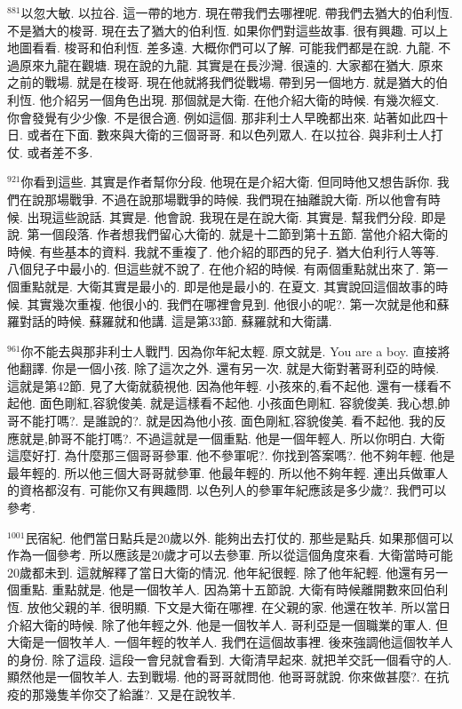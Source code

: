 \documentclass{book}
\begin{document}
$^{881}$以忽大敏.
以拉谷.
這一帶的地方.
現在帶我們去哪裡呢.
帶我們去猶大的伯利恆.
不是猶大的梭哥.
現在去了猶大的伯利恆.
如果你們對這些故事.
很有興趣.
可以上地圖看看.
梭哥和伯利恆.
差多遠.
大概你們可以了解.
可能我們都是在說.
九龍.
不過原來九龍在觀塘.
現在說的九龍.
其實是在長沙灣.
很遠的.
大家都在猶大.
原來之前的戰場.
就是在梭哥.
現在他就將我們從戰場.
帶到另一個地方.
就是猶大的伯利恆.
他介紹另一個角色出現.
那個就是大衛.
在他介紹大衛的時候.
有幾次經文.
你會發覺有少少像.
不是很合適.
例如這個.
那非利士人早晚都出來.
站著如此四十日.
或者在下面.
數來與大衛的三個哥哥.
和以色列眾人.
在以拉谷.
與非利士人打仗.
或者差不多.

$^{921}$你看到這些.
其實是作者幫你分段.
他現在是介紹大衛.
但同時他又想告訴你.
我們在說那場戰爭.
不過在說那場戰爭的時候.
我們現在抽離說大衛.
所以他會有時候.
出現這些說話.
其實是.
他會說.
我現在是在說大衛.
其實是.
幫我們分段.
即是說.
第一個段落.
作者想我們留心大衛的.
就是十二節到第十五節.
當他介紹大衛的時候.
有些基本的資料.
我就不重複了.
他介紹的耶西的兒子.
猶大伯利行人等等.
八個兒子中最小的.
但這些就不說了.
在他介紹的時候.
有兩個重點就出來了.
第一個重點就是.
大衛其實是最小的.
即是他是最小的.
在夏文.
其實說回這個故事的時候.
其實幾次重複.
他很小的.
我們在哪裡會見到.
他很小的呢?.
第一次就是他和蘇羅對話的時候.
蘇羅就和他講.
這是第33節.
蘇羅就和大衛講.

$^{961}$你不能去與那非利士人戰鬥.
因為你年紀太輕.
原文就是.
You are a boy.
直接將他翻譯.
你是一個小孩.
除了這次之外.
還有另一次.
就是大衛對著哥利亞的時候.
這就是第42節.
見了大衛就藐視他.
因為他年輕.
小孩來的,看不起他.
還有一樣看不起他.
面色剛紅,容貌俊美.
就是這樣看不起他.
小孩面色剛紅.
容貌俊美.
我心想,帥哥不能打嗎?.
是誰說的?.
就是因為他小孩.
面色剛紅,容貌俊美.
看不起他.
我的反應就是,帥哥不能打嗎?.
不過這就是一個重點.
他是一個年輕人.
所以你明白.
大衛這麼好打.
為什麼那三個哥哥參軍.
他不參軍呢?.
你找到答案嗎?.
他不夠年輕.
他是最年輕的.
所以他三個大哥哥就參軍.
他最年輕的.
所以他不夠年輕.
連出兵做軍人的資格都沒有.
可能你又有興趣問.
以色列人的參軍年紀應該是多少歲?.
我們可以參考.

$^{1001}$民宿紀.
他們當日點兵是20歲以外.
能夠出去打仗的.
那些是點兵.
如果那個可以作為一個參考.
所以應該是20歲才可以去參軍.
所以從這個角度來看.
大衛當時可能20歲都未到.
這就解釋了當日大衛的情況.
他年紀很輕.
除了他年紀輕.
他還有另一個重點.
重點就是.
他是一個牧羊人.
因為第十五節說.
大衛有時候離開數來回伯利恆.
放他父親的羊.
很明顯.
下文是大衛在哪裡.
在父親的家.
他還在牧羊.
所以當日介紹大衛的時候.
除了他年輕之外.
他是一個牧羊人.
哥利亞是一個職業的軍人.
但大衛是一個牧羊人.
一個年輕的牧羊人.
我們在這個故事裡.
後來強調他這個牧羊人的身份.
除了這段.
這段一會兒就會看到.
大衛清早起來.
就把羊交託一個看守的人.
顯然他是一個牧羊人.
去到戰場.
他的哥哥就問他.
他哥哥就說.
你來做甚麼?.
在抗疫的那幾隻羊你交了給誰?.
又是在說牧羊.
\end{document}
